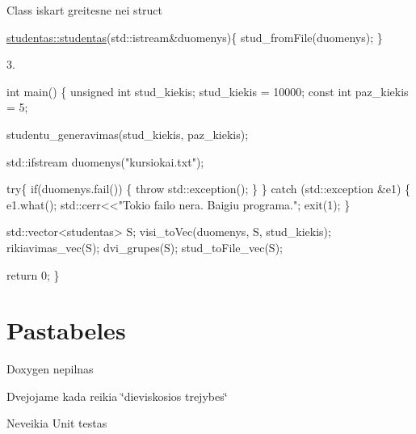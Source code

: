 \begin{DoxyEnumerate}
\item {\ttfamily Class} iskart greitesne nei {\ttfamily struct}
\item 
\begin{DoxyCode}
\mbox{\hyperlink{classstudentas_a40a99ea5d527a3d443123f4785550787}{studentas::studentas}}(std::istream&duomenys)\{
    stud\_fromFile(duomenys);
\}
\end{DoxyCode}
 3. 
\begin{DoxyCode}
\textcolor{keywordtype}{int} main()
\{
        \textcolor{keywordtype}{unsigned} \textcolor{keywordtype}{int} stud\_kiekis;
        stud\_kiekis = 10000;
        \textcolor{keyword}{const} \textcolor{keywordtype}{int} paz\_kiekis = 5;

        studentu\_generavimas(stud\_kiekis, paz\_kiekis);

        std::ifstream duomenys(\textcolor{stringliteral}{"kursiokai.txt"});

        \textcolor{keywordflow}{try}\{
            \textcolor{keywordflow}{if}(duomenys.fail())
            \{
                \textcolor{keywordflow}{throw} std::exception();
            \}
        \}
        \textcolor{keywordflow}{catch} (std::exception &e1)
        \{   e1.what();
            std::cerr<<\textcolor{stringliteral}{"Tokio failo nera. Baigiu programa."};
            exit(1);
        \}

            std::vector<studentas> S;
            visi\_toVec(duomenys, S, stud\_kiekis);
            rikiavimas\_vec(S);
            dvi\_grupes(S);
            stud\_toFile\_vec(S);

        \textcolor{keywordflow}{return} 0;
 \}
\end{DoxyCode}

\end{DoxyEnumerate}

\section*{Pastabeles}


\begin{DoxyItemize}
\item Doxygen nepilnas
\item Dvejojame kada reikia \char`\"{}dieviskosios trejybes\char`\"{}
\item Neveikia Unit testas 
\end{DoxyItemize}